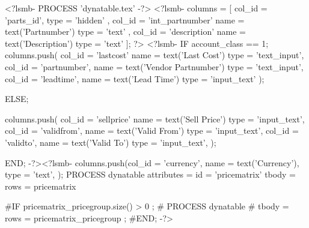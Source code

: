 \documentclass[a4paper]{article}
\begin{document}
<?lsmb- PROCESS 'dynatable.tex' -?>
<?lsmb-
    columns = [ 
              { col_id = 'parts_id',
                  type = 'hidden' },
              { col_id = 'int_partnumber'
                  name = text('Partnumber')
                  type = 'text'
                },
                { col_id = 'description'
                  name = text('Description')
                  type = 'text'
                } ];
?> <?lsmb-
     IF account_class == 1;
         columns.push(
                  {col_id = 'lastcost'
                     name = text('Last Cost') 
                     type = 'text_input'},
                  {col_id = 'partnumber',
                     name = text('Vendor Partnumber') 
                     type = 'text_input'},
                  {col_id = 'leadtime',
                     name = text('Lead Time') 
                     type = 'input_text'}
         );

     ELSE;

         columns.push(
                  {col_id = 'sellprice'
                     name = text('Sell Price') 
                     type = 'input_text'},
                  {col_id = 'validfrom',
                     name = text('Valid From') 
                     type = 'input_text'},
                  {col_id = 'validto',
                     name = text('Valid To') 
                     type = 'input_text'},
         );
                        
     END;
-?><?lsmb-
     columns.push({col_id = 'currency',
                     name = text('Currency'),
                     type = 'text'},
     );
      PROCESS dynatable
    attributes = { id = 'pricematrix' }
         tbody = { rows = pricematrix }

   #IF pricematrix_pricegroup.size() > 0 ;
   #  PROCESS dynatable
   #      tbody = { rows = pricematrix_pricegroup };
   #END;
-?>
\end{document}
